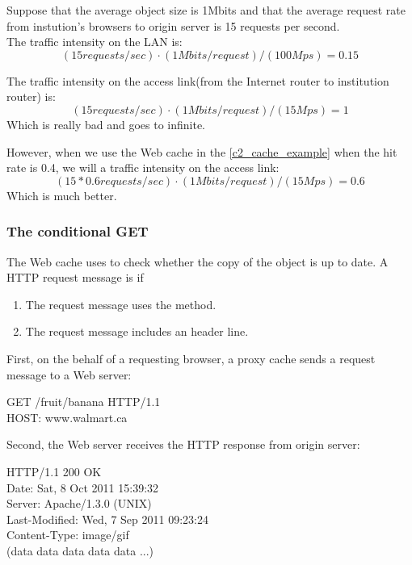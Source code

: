 Suppose that the average object size is 1Mbits and that the average request rate from instution's
browsers to origin server is 15 requests per second.\\
The traffic intensity on the LAN is:
\begin{equation}
    (15 requests/sec) \cdot (1 Mbits/request) / (100Mps) = 0.15
    \label{c2_lan_traffic_intensity}
\end{equation}

The traffic intensity on the access link(from the Internet router to institution
router) is:
\begin{equation}
    (15 requests/sec) \cdot (1 Mbits/request) / (15Mps) = 1
    \label{c2_accessLink_traffic_intensity}
\end{equation}
Which is really bad and goes to infinite.

However, when we use the Web cache in the \autoref{c2_cache_example} when the hit rate is 0.4,
we will a traffic intensity on the access link:
\begin{equation}
    (15*0.6 requests/sec) \cdot (1 Mbits/request) / (15Mps) =0.6
\end{equation}
Which is much better.

\subsubsection{The conditional \textbf{GET}}


The Web cache uses  to check whether the copy of the object is up to date.
A HTTP request message is  if
\begin{enumerate}
    \item The request message uses the  method.
    \item The request message includes an  header line.
\end{enumerate}

First, on the behalf of a requesting browser, a proxy cache sends a request message
to a Web server:

\begin{center}
    GET /fruit/banana HTTP/1.1\\
    HOST: www.walmart.ca
\end{center}

Second, the Web server receives the HTTP response from origin server:

\begin{center}
    HTTP/1.1 200 OK\\
    Date: Sat, 8 Oct 2011 15:39:32\\
    Server: Apache/1.3.0 (UNIX)\\
    Last-Modified: Wed, 7 Sep 2011 09:23:24\\
    Content-Type: image/gif\\
    (data data data data data ...)
\end{center}

